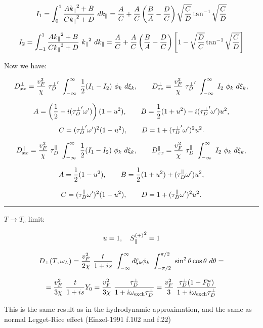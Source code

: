 \documentclass[a4paper]{article}
\begin{document}
$$
I_1 = \int_0^1 \frac{A\kpa^2 + B}{C \kpa^2 + D}\ d\kpa = 
\frac{A}{C} + \frac{A}{C}\left(\frac{B}{A} - \frac{D}{C}\right)
\sqrt{\frac{C}{D}}\tan^{-1}\sqrt{\frac{C}{D}}
$$

$$
I_2 = \int_{-1}^{1} \frac{A\kpa^2 + B}{C \kpa^2 + D}\ \kpa^2\ d\kpa =
\frac{A}{C} + \frac{A}{C}\left(\frac{B}{A} - \frac{D}{C}\right)
\left[ 1 - \sqrt{\frac{D}{C}}\tan^{-1}\sqrt{\frac{C}{D}} \right]
$$

Now we have:

$$
D^\perp_{xx} =
  \frac{v_F^2}{\chi}\ \tp
  \ \int_{-\infty}^{\infty}
  \ \frac12 (I_1-I_2)\ \phi_k\ d\xi_k,
\qquad
D^\perp_{zz} =
  \frac{v_F^2}{\chi}\ \tp
  \ \int_{-\infty}^{\infty}
  \ I_2\ \phi_k\ d\xi_k,
$$

$$
A = \left(\frac12 - i(\tp\op)\right) (1-u^2), \qquad
B = \frac12 (1+u^2) - i(\tp\op) u^2,
$$
$$
C = (\tp\op)^2 (1-u^2),\qquad
D = 1 + (\tp\op)^2 u^2.
$$

$$
D^\parallel_{xx} =
  \frac{v_F^2}{\chi}\ \t
  \ \int_{-\infty}^{\infty}
  \ \frac12 (I_1-I_2)\ \phi_k\ d\xi_k,
\qquad
D^\parallel_{xx} =
  \frac{v_F^2}{\chi}\ \t
  \ \int_{-\infty}^{\infty}
  \ I_2\ \phi_k\ d\xi_k,
$$

$$
A = \frac12 (1-u^2), \qquad
B = \frac12 (1+u^2) + (\t\op) u^2,
$$

$$
C = (\t\op)^2 (1-u^2),\qquad
D = 1 + (\t\op)^2 u^2.
$$

\hrule\medskip

$T\rightarrow T_c$ limit:

$$
u=1,\quad
{\sp} = 1
$$

$$
D_\perp (T, \ol) =
  \frac{v_F^2}{2\chi}
  \ \frac{t}{1+is}
  \ \int_{-\infty}^{\infty}
  d\xi_k\phi_k
  \ \int_{-\pi/2}^{\pi/2}
  \  \sin^2\theta \cos\theta \ d\theta =
$$

$$
  = \frac{v_F^2}{3\chi} \ \frac{t}{1+is} Y_0
  = \frac{v_F^2}{3\chi} \ \frac{\tdp}{1+i\oe\tdp}
  = \frac{v_F^2}{3}\ \frac{\tdp (1+F_0^a)}{1+i\oe\tdp}
$$

This is the same result as in the hydrodynamic approximation,
and the same as normal Legget-Rice effect (Einzel-1991 f.102 and f.22)
\end{document}
